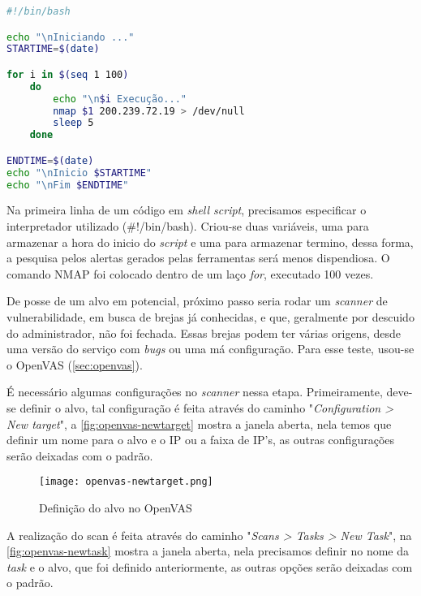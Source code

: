 \begin{lstlisting}[caption={Automatização das execuções do comando NMAP},language=bash, frame=single, label={lst:script-nmap}]
#!/bin/bash

echo "\nIniciando ..."
STARTIME=$(date)

for i in $(seq 1 100)
    do  
        echo "\n$i Execução..."
        nmap $1 200.239.72.19 > /dev/null
        sleep 5
    done

ENDTIME=$(date)                                                                                                                                                                 
echo "\nInicio $STARTIME"
echo "\nFim $ENDTIME"
\end{lstlisting}

Na primeira linha de um código em \textit{shell script}, precisamos especificar o interpretador utilizado (\#!/bin/bash). Criou-se duas variáveis, uma para armazenar a hora do inicio do \textit{script} e uma para armazenar termino, dessa forma, a pesquisa pelos alertas gerados pelas ferramentas será menos dispendiosa. O comando NMAP foi colocado dentro de um laço \textit{for}, executado 100 vezes. 

De posse de um alvo em potencial, próximo passo seria rodar um \textit{scanner} de vulnerabilidade, em busca de brejas já conhecidas, e que, geralmente por descuido do administrador, não foi fechada. Essas brejas podem ter várias origens, desde uma versão do serviço com \textit{bugs} ou uma má configuração. Para esse teste, usou-se o OpenVAS (\autoref{sec:openvas}).

É necessário algumas configurações no \textit{scanner} nessa etapa. Primeiramente, deve-se definir o alvo, tal configuração é feita através do caminho "\textit{Configuration > New target}", a \autoref{fig:openvas-newtarget} mostra a janela aberta, nela temos que definir um nome para o alvo e o IP ou a faixa de IP's, as outras configurações serão deixadas com o padrão.

\begin{figure}[!htb]
\centering
\caption{Definição do alvo no OpenVAS}
\texttt{[image: openvas-newtarget.png]}
\label{fig:openvas-newtarget}
\end{figure}

A realização do scan é feita através do caminho "\textit{Scans > Tasks > New Task}", na \autoref{fig:openvas-newtask} mostra a janela aberta, nela precisamos definir no nome da \textit{task} e o alvo, que foi definido anteriormente, as outras opções serão deixadas com o padrão. 

